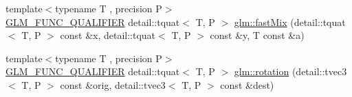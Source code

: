 \begin{DoxyCompactItemize}
\item 
{\footnotesize template$<$typename T , precision P$>$ }\\\hyperlink{setup_8hpp_a33fdea6f91c5f834105f7415e2a64407}{G\+L\+M\+\_\+\+F\+U\+N\+C\+\_\+\+Q\+U\+A\+L\+I\+F\+I\+ER} detail\+::tquat$<$ T, P $>$ \hyperlink{group__gtx__quaternion_ga5d1bb2670d0c73fff5912134ba7c024c}{glm\+::fast\+Mix} (detail\+::tquat$<$ T, P $>$ const \&x, detail\+::tquat$<$ T, P $>$ const \&y, T const \&a)
\item 
{\footnotesize template$<$typename T , precision P$>$ }\\\hyperlink{setup_8hpp_a33fdea6f91c5f834105f7415e2a64407}{G\+L\+M\+\_\+\+F\+U\+N\+C\+\_\+\+Q\+U\+A\+L\+I\+F\+I\+ER} detail\+::tquat$<$ T, P $>$ \hyperlink{group__gtx__quaternion_ga964b26fdcd9f6f694c1003b0571092a6}{glm\+::rotation} (detail\+::tvec3$<$ T, P $>$ const \&orig, detail\+::tvec3$<$ T, P $>$ const \&dest)
\end{DoxyCompactItemize}
